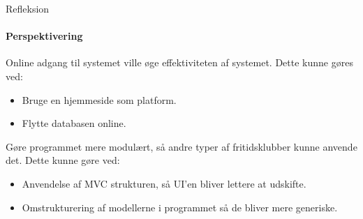 \begin{frame}{Refleksion}
\framesubtitle{Perspektivering}
Online adgang til systemet ville øge effektiviteten af systemet. Dette kunne gøres ved:
\begin{itemize}
\item Bruge en hjemmeside som platform.
\item Flytte databasen online.
\end{itemize}
Gøre programmet mere modulært, så andre typer af fritidsklubber kunne anvende det.
Dette kunne gøre ved:
\begin{itemize}
 \item Anvendelse af MVC strukturen, så UI'en bliver lettere at udskifte.
 \item Omstrukturering af modellerne i programmet så de bliver mere generiske.
\end{itemize}
\end{frame}
